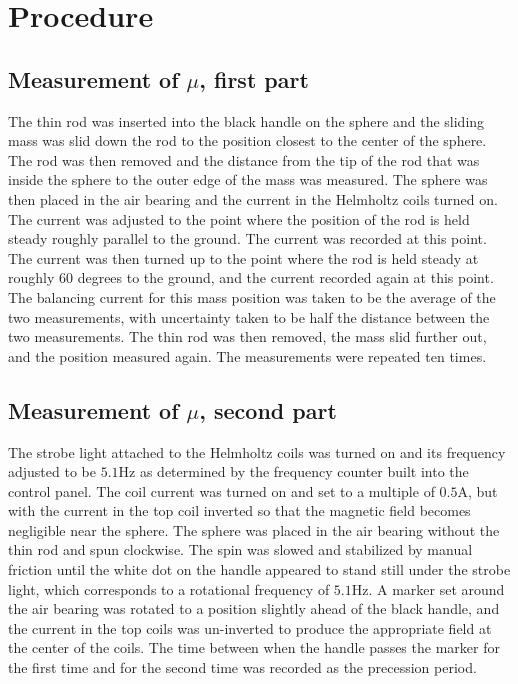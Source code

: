 \documentclass{amsart}
\numberwithin{equation}{section}
\begin{document}
\section{Procedure}
\subsection{Measurement of $\mu$, first part}
The thin rod was inserted into the black handle on the sphere and the sliding mass was slid down the rod to the position closest to the center of the sphere. The rod was then removed and the distance from the tip of the rod that was inside the sphere to the outer edge of the mass was measured. The sphere was then placed in the air bearing and the current in the Helmholtz coils turned on. The current was adjusted to the point where the position of the rod is held steady roughly parallel to the ground. The current was recorded at this point. The current was then turned up to the point where the rod is held steady at roughly 60 degrees to the ground, and the current recorded again at this point. The balancing current for this mass position was taken to be the average of the two measurements, with uncertainty taken to be half the distance between the two measurements. The thin rod was then removed, the mass slid further out, and the position measured again. The measurements were repeated ten times.
\subsection{Measurement of $\mu$, second part}
The strobe light attached to the Helmholtz coils was turned on and its frequency adjusted to be $5.1$Hz as determined by the frequency counter built into the control panel. The coil current was turned on and set to a multiple of $0.5$A, but with the current in the top coil inverted so that the magnetic field becomes negligible near the sphere. The sphere was placed in the air bearing without the thin rod and spun clockwise. The spin was slowed and stabilized by manual friction until the white dot on the handle appeared to stand still under the strobe light, which corresponds to a rotational frequency of $5.1$Hz. A marker set around the air bearing was rotated to a position slightly ahead of the black handle, and the current in the top coils was un-inverted to produce the appropriate field at the center of the coils. The time between when the handle passes the marker for the first time and for the second time was recorded as the precession period. 
\end{document}

